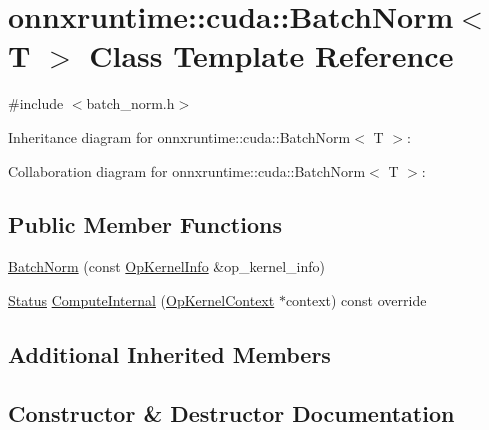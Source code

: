 \hypertarget{classonnxruntime_1_1cuda_1_1BatchNorm}{}\section{onnxruntime\+:\+:cuda\+:\+:Batch\+Norm$<$ T $>$ Class Template Reference}
\label{classonnxruntime_1_1cuda_1_1BatchNorm}


{\ttfamily \#include $<$batch\+\_\+norm.\+h$>$}



Inheritance diagram for onnxruntime\+:\+:cuda\+:\+:Batch\+Norm$<$ T $>$\+:


Collaboration diagram for onnxruntime\+:\+:cuda\+:\+:Batch\+Norm$<$ T $>$\+:
\subsection*{Public Member Functions}
\begin{DoxyCompactItemize}
\item 
\mbox{\hyperlink{classonnxruntime_1_1cuda_1_1BatchNorm_ad5ba380af35fb19e5ea03845b2143cc4}{Batch\+Norm}} (const \mbox{\hyperlink{classonnxruntime_1_1OpKernelInfo}{Op\+Kernel\+Info}} \&op\+\_\+kernel\+\_\+info)
\item 
\mbox{\hyperlink{classonnxruntime_1_1common_1_1Status}{Status}} \mbox{\hyperlink{classonnxruntime_1_1cuda_1_1BatchNorm_a6ded0b7a7aa66e3fcc133c5e1883cf27}{Compute\+Internal}} (\mbox{\hyperlink{classonnxruntime_1_1OpKernelContext}{Op\+Kernel\+Context}} $\ast$context) const override
\end{DoxyCompactItemize}
\subsection*{Additional Inherited Members}


\subsection{Constructor \& Destructor Documentation}
\mbox{\label{classonnxruntime_1_1cuda_1_1BatchNorm_ad5ba380af35fb19e5ea03845b2143cc4}} 
